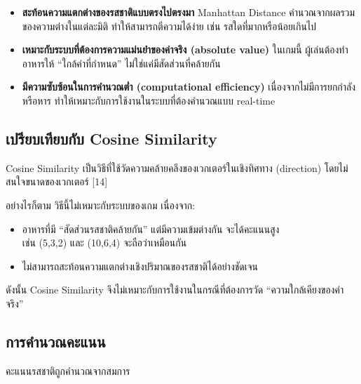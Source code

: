 \begin{itemize}
  \item \textbf{สะท้อนความแตกต่างของรสชาติแบบตรงไปตรงมา}\newline
  \hspace{1.5em}Manhattan Distance คำนวณจากผลรวมของความต่างในแต่ละมิติ ทำให้สามารถตีความได้ง่าย เช่น รสใดที่มากหรือน้อยเกินไป
  \item \textbf{เหมาะกับระบบที่ต้องการความแม่นยำของค่าจริง (absolute value)}\newline
  \hspace{1.5em}ในเกมนี้ ผู้เล่นต้องทำอาหารให้ “ใกล้ค่าที่กำหนด” ไม่ใช่แค่มีสัดส่วนที่คล้ายกัน
  \item \textbf{มีความซับซ้อนในการคำนวณต่ำ (computational efficiency)}\newline
  \hspace{1.5em}เนื่องจากไม่มีการยกกำลังหรือหาร ทำให้เหมาะกับการใช้งานในระบบที่ต้องคำนวณแบบ real-time
\end{itemize}

\subsection{เปรียบเทียบกับ Cosine Similarity}
\hspace{1.5em}Cosine Similarity เป็นวิธีที่ใช้วัดความคล้ายคลึงของเวกเตอร์ในเชิงทิศทาง (direction) โดยไม่สนใจขนาดของเวกเตอร์ [14]

\vspace{1\baselineskip}
อย่างไรก็ตาม วิธีนี้ไม่เหมาะกับระบบของเกม เนื่องจาก:

\begin{itemize}
  \item อาหารที่มี “สัดส่วนรสชาติคล้ายกัน” แต่มีความเข้มต่างกัน จะได้คะแนนสูง \\เช่น (5,3,2) และ (10,6,4) จะถือว่าเหมือนกัน
  \item ไม่สามารถสะท้อนความแตกต่างเชิงปริมาณของรสชาติได้อย่างชัดเจน
\end{itemize}

\vspace{0.2\baselineskip}
ดังนั้น Cosine Similarity จึงไม่เหมาะกับการใช้งานในกรณีที่ต้องการวัด “ความใกล้เคียงของค่าจริง”

\subsection{การคำนวณคะแนน}
\hspace{1.5em}คะแนนรสชาติถูกคำนวณจากสมการ

